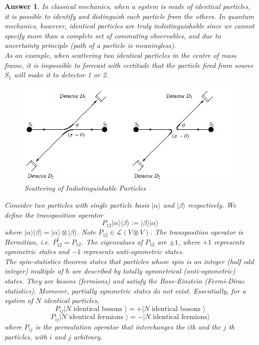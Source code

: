 \documentclass[a4paper]{article}
\newtheorem{ans}{Answer}[section]
\theoremstyle{new}
\begin{document}
\begin{ans}
In classical mechanics, when a system is made of identical particles, it is possible to identify and distinguish each particle from the others. In quantum mechanics, however, identical particles are truly indistinguishable since we cannot specify more than a complete set of commuting observables, and due to uncertainty principle (path of a particle is meaningless).\\[5pt]
As an example, when scattering two identical particles in the centre of mass frame, it is impossible to forecast with certitude that the particle fired from source $S_1$ will make it to detector 1 or 2. 
\begin{figure}[H]
    \centering
    \includegraphics[width=\linewidth]{indistinguishable.PNG}
    \caption{Scattering of Indistinguishable Particles}
\end{figure}
Consider two particles with single particle basis $|\alpha\rangle$ and $|\beta\rangle$ respectively. We define the transposition operator
$$P_{12}|\alpha\rangle|\beta\rangle:=|\beta\rangle|\alpha\rangle$$
where $|\alpha\rangle|\beta\rangle=|\alpha\rangle\otimes|\beta\rangle$. Note $P_{12}\in\mathcal{L}(V\otimes V)$. The transposition operator is Hermitian, i.e. $P_{12}^\dag=P_{12}$. The eigenvalues of $P_{12}$ are $\pm1$, where $+1$ represents symmetric states and $-1$ represents anti-symmetric states.\\[5pt]
The spin-statistics theorem states that particles whose spin is an integer (half odd integer) multiple of $\hbar$ are described by totally symmetrical (anti-symmetric) states. They are bosons (fermions) and satisfy the Bose-Einstein (Fermi-Dirac statistics). Moreover, partially symmetric states do not exist. Essentially, for a system of $N$ identical particles,
$$P_{ij}|N\text{ identical bosons }\rangle=+|N\text{ identical bosons }\rangle$$
$$P_{ij}|N\text{ identical fermions }\rangle=-|N\text{ identical fermions}\rangle$$
where $P_{ij}$ is the permutation operator that interchanges the $i$th and the $j$ th particles, with $i$ and $j$ arbitrary.\\[5pt]

\end{ans}
\end{document}
